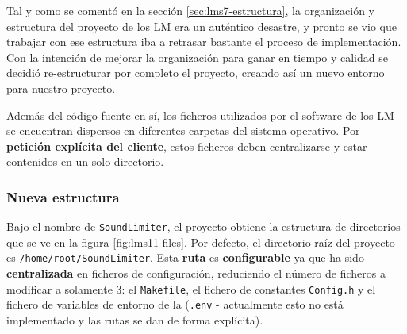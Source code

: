 Tal y como se comentó en la sección \ref{sec:lms7-estructura}, la organización y estructura del proyecto de los LM era un auténtico desastre, y pronto se vio que trabajar con ese estructura iba a retrasar bastante el proceso de implementación. Con la intención de mejorar la organización para ganar en tiempo y calidad se decidió re-estructurar por completo el proyecto, creando así un nuevo entorno para nuestro proyecto.

Además del código fuente en sí, los ficheros utilizados por el software de los LM se encuentran dispersos en diferentes carpetas del sistema operativo. Por \textbf{petición explícita del cliente}, estos ficheros deben centralizarse y estar contenidos en un solo directorio.

\subsubsection{Nueva estructura}

Bajo el nombre de \texttt{SoundLimiter}, el proyecto obtiene la estructura de directorios que se ve en la figura \ref{fig:lms11-files}. Por defecto, el directorio raíz del proyecto es \texttt{/home/root/SoundLimiter}. Esta \textbf{ruta} es \textbf{configurable} ya que ha sido \textbf{centralizada} en ficheros de configuración, reduciendo el número de ficheros a modificar a solamente 3: el \texttt{Makefile}, el fichero de constantes \texttt{Config.h} y el fichero de variables de entorno de la  (\texttt{.env} - actualmente esto no está implementado y las rutas se dan de forma explícita).

